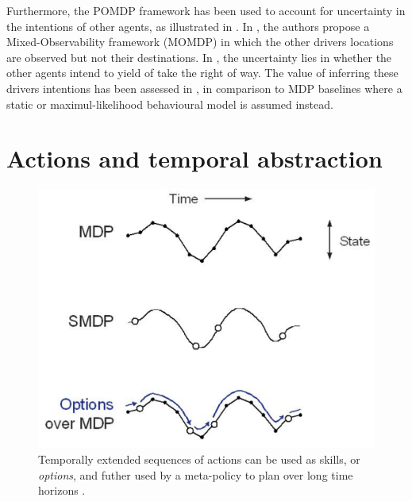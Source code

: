 Furthermore, the POMDP framework has been used to account for uncertainty in the intentions of other agents, as illustrated in . In \citep{Bandyopadhyay2013}, the authors propose a Mixed-Observability framework (MOMDP) in which the other drivers locations are observed but not their destinations. In \citep{Barbier2018}, the uncertainty lies in whether the other agents intend to yield of take the right of way. The value of inferring these drivers intentions has been assessed in \citep{Sunberg2017}, in comparison to MDP baselines where a static or maximul-likelihood behavioural model is assumed instead.



\section{Actions and temporal abstraction}

\begin{figure}[th]
	\centering
	\includegraphics[width=0.5\linewidth]{img/smdp}
	\caption{Temporally extended sequences of actions can be used as skills, or \emph{options}, and futher used by a meta-policy to plan over long time horizons \citep{Sutton1999}.}
	\label{fig:smdp}
\end{figure}

